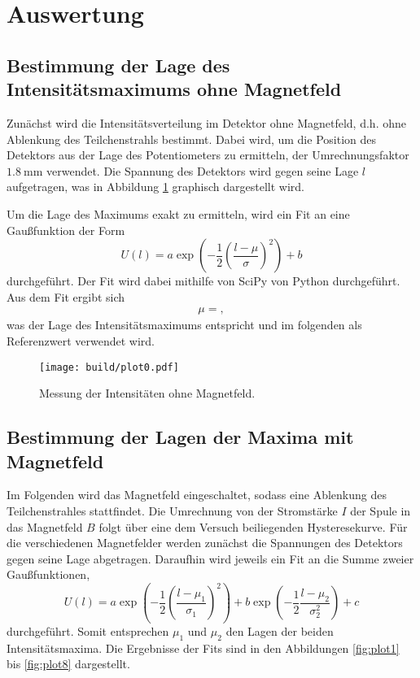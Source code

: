 \section{Auswertung}
\label{sec:Auswertung}
\subsection{Bestimmung der Lage des Intensitätsmaximums ohne Magnetfeld}

Zunächst wird die Intensitätsverteilung im Detektor ohne Magnetfeld, d.h. ohne Ablenkung des Teilchenstrahls bestimmt.
Dabei wird, um die Position des Detektors aus der Lage des Potentiometers zu ermitteln, der Umrechnungsfaktor $\SI{1.8}{\milli\metre}$ verwendet.
Die Spannung des Detektors wird gegen seine Lage $l$ aufgetragen, was in Abbildung \ref{fig:plot0} graphisch dargestellt wird.

Um die Lage des Maximums exakt zu ermitteln, wird ein Fit an eine Gaußfunktion der Form
\begin{equation}
  U(l) = a \exp{\left( -\frac{1}{2} \left( \frac{l - \mu}{\sigma}\right)^2 \right)} + b
\end{equation}
durchgeführt.
Der Fit wird dabei mithilfe von SciPy von Python durchgeführt.
Aus dem Fit ergibt sich
\begin{align*}
  \mu = ,
\end{align*}
was der Lage des Intensitätsmaximums entspricht und im folgenden als Referenzwert verwendet wird.
\begin{figure}
  \centering
  \texttt{[image: build/plot0.pdf]}
  \caption{Messung der Intensitäten ohne Magnetfeld.}
  \label{fig:plot0}
\end{figure}

\subsection{Bestimmung der Lagen der Maxima mit Magnetfeld}
Im Folgenden wird das Magnetfeld eingeschaltet, sodass eine Ablenkung des Teilchenstrahles stattfindet.
Die Umrechnung von der Stromstärke $I$ der Spule in das Magnetfeld $B$ folgt über eine dem Versuch beiliegenden Hysteresekurve.
Für die verschiedenen Magnetfelder werden zunächst die Spannungen des Detektors gegen seine Lage abgetragen.
Daraufhin wird jeweils ein Fit an die Summe zweier Gaußfunktionen,
\begin{equation}
  U(l) = a \exp{\left( -\frac{1}{2} \left(\frac{l - \mu_1}{\sigma_1}\right)^2 \right)} +  b \exp{\left( -\frac{1}{2} \frac{l - \mu_2}{\sigma_2^2} \right)} + c
\end{equation}
durchgeführt.
Somit entsprechen $\mu_1$ und $\mu_2$ den Lagen der beiden Intensitätsmaxima.
Die Ergebnisse der Fits sind in den Abbildungen \ref{fig:plot1} bis \ref{fig:plot8} dargestellt.

